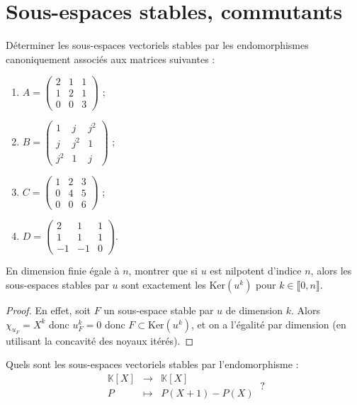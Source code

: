 \documentclass[french,a4paper]{article}
\newcommand{\K}{\mathbb{K}}
\renewcommand{\ker}{\text{Ker}}
\theoremstyle{plain}
\theoremstyle{definition}
\theoremstyle{remark}
\begin{document}
\section{Sous-espaces stables, commutants}

\begin{ex}{}
	Déterminer les sous-espaces vectoriels stables par les endomorphismes canoniquement associés aux matrices suivantes : 
	\begin{enumerate}
		\item $A=\displaystyle\begin{pmatrix}
			2&1&1\\
			1&2&1\\
			0&0&3
		\end{pmatrix}$ ;
		\item $B=\displaystyle\begin{pmatrix}
			1&j&j^2\\
			j&j^2&1\\
			j^2&1&j
		\end{pmatrix}$ ;
		\item $C=\displaystyle\begin{pmatrix}
			1&2&3\\
			0&4&5\\
			0&0&6
		\end{pmatrix}$ ;
		\item $D=\displaystyle\begin{pmatrix}
			2&1&1\\
			1&1&1\\
			-1&-1&0
		\end{pmatrix}$.
	\end{enumerate}
\end{ex}

\begin{ex}{}
	En dimension finie égale à $n$, montrer que si $u$ est nilpotent d’indice $n$, alors les sous-espaces stables par $u$ sont exactement les $\ker(u^k)$ pour $k\in\llbracket0, n\rrbracket$.
\end{ex}
\begin{proof}
	En effet, soit $F$ un sous-espace stable par $u$ de dimension $k$. Alors $\chi_{u_F}=X^k$ donc $u_F^k=0$ donc $F\subset\ker(u^k)$, et on a l'égalité par dimension (en utilisant la concavité des noyaux itérés).
\end{proof}

\begin{ex}{}
	Quels sont les sous-espaces vectoriels stables par l'endomorphisme : $$\begin{array}{rcl}
		\K[X]&\longrightarrow&\K[X]\\
		P&\longmapsto&P(X+1)-P(X)
	\end{array}\ ?$$
\end{ex}
\end{document}
